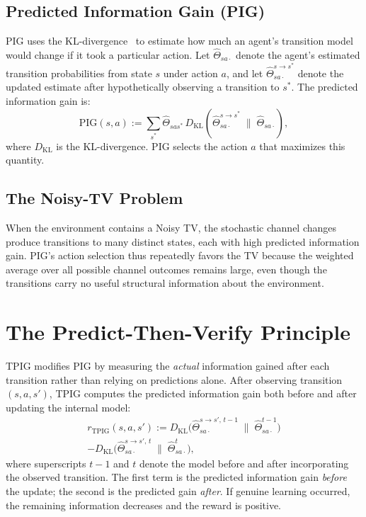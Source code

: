 \documentclass[letterpaper]{article}
\begin{document}
\subsection{Predicted Information Gain (PIG)}

PIG uses the KL-divergence~\cite{Kullback1951information} to estimate
how much an agent's transition model would change if it took a
particular action.  Let
$\hat{\Theta}_{sa\cdot}$ denote the agent's estimated transition
probabilities from state $s$ under action $a$, and let
$\hat{\Theta}_{sa\cdot}^{s \to s^*}$ denote the updated estimate
after hypothetically observing a transition to $s^*$.  The predicted
information gain is:
\begin{equation}
  \textrm{PIG}(s,a) := \sum_{s^*} \hat{\Theta}_{sas^*}\,
  D_{\textrm{KL}}\!\left(\hat{\Theta}_{sa\cdot}^{s \to s^*}
  \;\|\;\hat{\Theta}_{sa\cdot}\right),
  \label{eq:PIG}
\end{equation}
where $D_{\textrm{KL}}$ is the KL-divergence.  PIG selects the action
$a$ that maximizes this quantity.

\subsection{The Noisy-TV Problem}

When the environment contains a Noisy TV, the stochastic channel
changes produce transitions to many distinct states, each with high
predicted information gain.  PIG's action selection thus repeatedly
favors the TV because the weighted average over all possible channel
outcomes remains large, even though the transitions carry no useful
structural information about the environment.

\section{The Predict-Then-Verify Principle}

TPIG modifies PIG by measuring the \emph{actual} information gained
after each transition rather than relying on predictions alone.  After
observing transition $(s,a,s')$, TPIG computes the predicted
information gain both before and after updating the internal model:
\begin{multline}
  r_{\textrm{TPIG}}(s,a,s') :=
  D_{\textrm{KL}}\!\bigl(\hat{\Theta}_{sa\cdot}^{s \to s',\,t-1}
  \;\|\;\hat{\Theta}_{sa\cdot}^{t-1}\bigr) \\
  - D_{\textrm{KL}}\!\bigl(\hat{\Theta}_{sa\cdot}^{s \to s',\,t}
  \;\|\;\hat{\Theta}_{sa\cdot}^{t}\bigr),
  \label{eq:TPIGReward}
\end{multline}
where superscripts $t{-}1$ and $t$ denote the model before and after
incorporating the observed transition.  The first term is the
predicted information gain \emph{before} the update; the second is the
predicted gain \emph{after}.  If genuine learning occurred, the
remaining information decreases and the reward is positive.
\end{document}
